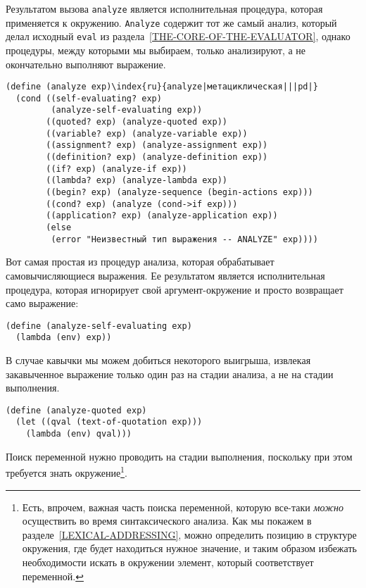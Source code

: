 Результатом вызова {\tt analyze} является
исполнительная процедура, которая применяется к окружению.  {\tt Analyze}
содержит тот же самый анализ, который делал исходный {\tt eval}
из раздела~\ref{THE-CORE-OF-THE-EVALUATOR}, однако
процедуры, между которыми мы выбираем, только анализируют, а не
окончательно выполняют выражение.

\begin{Verbatim}[fontsize=\small]
(define (analyze exp)\index{ru}{analyze|метациклическая|||pd|}
  (cond ((self-evaluating? exp) 
         (analyze-self-evaluating exp))
        ((quoted? exp) (analyze-quoted exp))
        ((variable? exp) (analyze-variable exp))
        ((assignment? exp) (analyze-assignment exp))
        ((definition? exp) (analyze-definition exp))
        ((if? exp) (analyze-if exp))
        ((lambda? exp) (analyze-lambda exp))
        ((begin? exp) (analyze-sequence (begin-actions exp)))
        ((cond? exp) (analyze (cond->if exp)))
        ((application? exp) (analyze-application exp))
        (else
         (error "Неизвестный тип выражения -- ANALYZE" exp))))
\end{Verbatim}

Вот самая простая из процедур анализа, которая обрабатывает
самовычисляющиеся выражения.  Ее результатом является исполнительная
процедура, которая игнорирует свой аргумент-окружение и просто
возвращает само выражение:

\begin{Verbatim}[fontsize=\small]
(define (analyze-self-evaluating exp)
  (lambda (env) exp))
\end{Verbatim}

В случае кавычки мы можем добиться
некоторого выигрыша, извлекая закавыченное выражение только один раз
на стадии анализа, а не на стадии выполнения.

\begin{Verbatim}[fontsize=\small]
(define (analyze-quoted exp)
  (let ((qval (text-of-quotation exp)))
    (lambda (env) qval)))
\end{Verbatim}

Поиск переменной нужно проводить на стадии выполнения,
поскольку при этом требуется знать окружение\footnote{Есть,
впрочем, важная часть поиска переменной, которую
все-таки {\em можно} осуществить во время синтаксического анализа.
Как мы покажем в разделе~\ref{LEXICAL-ADDRESSING}, можно
определить позицию в структуре окружения, где будет находиться
нужное значение, и таким образом избежать необходимости
искать в окружении элемент, который соответствует переменной.}.

